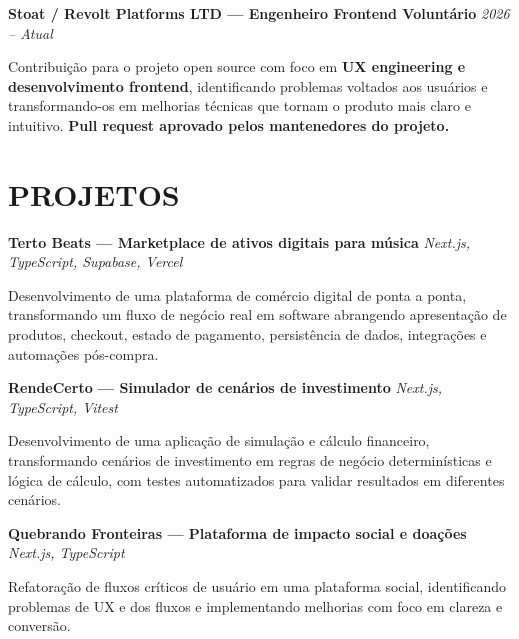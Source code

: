 \documentclass[10pt,a4paper]{article}
\begin{document}
\noindent
\textbf{Stoat / Revolt Platforms LTD — Engenheiro Frontend Voluntário}
\hfill
\textit{2026 -- Atual}

\footnotesize

Contribuição para o projeto open source com foco em
\textbf{UX engineering e desenvolvimento frontend}, identificando
problemas voltados aos usuários e transformando-os em melhorias
técnicas que tornam o produto mais claro e intuitivo.
\textbf{Pull request aprovado pelos mantenedores do projeto.}


\section*{PROJETOS}

\noindent
\textbf{Terto Beats — Marketplace de ativos digitais para música}
\hfill
\textit{Next.js, TypeScript, Supabase, Vercel}

\footnotesize

Desenvolvimento de uma plataforma de comércio digital de ponta a
ponta, transformando um fluxo de negócio real em software abrangendo
apresentação de produtos, checkout, estado de pagamento, persistência
de dados, integrações e automações pós-compra.

\vspace{0.5pt}

\noindent
\textbf{RendeCerto — Simulador de cenários de investimento}
\hfill
\textit{Next.js, TypeScript, Vitest}

\footnotesize

Desenvolvimento de uma aplicação de simulação e cálculo financeiro,
transformando cenários de investimento em regras de negócio
determinísticas e lógica de cálculo, com testes automatizados para
validar resultados em diferentes cenários.

\vspace{0.5pt}

\noindent
\textbf{Quebrando Fronteiras — Plataforma de impacto social e doações}
\hfill
\textit{Next.js, TypeScript}

\footnotesize

Refatoração de fluxos críticos de usuário em uma plataforma social,
identificando problemas de UX e dos fluxos e implementando melhorias
com foco em clareza e conversão.

\end{document}
